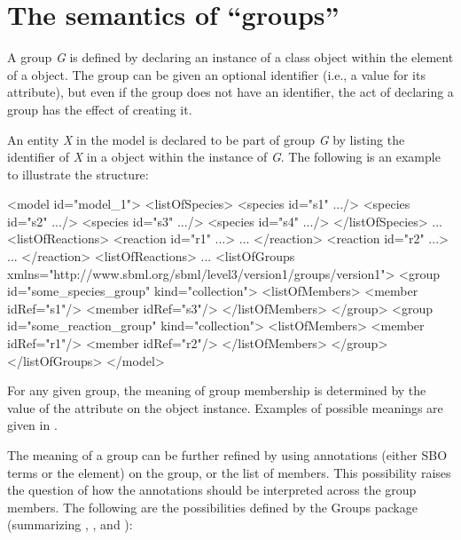 \section{The semantics of ``groups''}
\label{semantics}

A group \emph{G} is defined by declaring an instance of a \Group class object within the \ListOfGroups element of a \Model object. The group can be given an optional identifier (i.e., a value for its  attribute), but even if the group does not have an identifier, the act of declaring a group has the effect of creating it.

An entity \emph{X} in the model is declared to be part of group \emph{G} by listing the identifier of \emph{X} in a \Member object within the \ListOfGroups instance of \emph{G}. The following is an example to illustrate the structure:

\begin{example}
<model id="model_1"> 
  <listOfSpecies> 
    <species id="s1" .../> 
    <species id="s2" .../> 
    <species id="s3" .../> 
    <species id="s4" .../> 
  </listOfSpecies> 
  ... 
  <listOfReactions> 
    <reaction id="r1" ...> ... </reaction> 
    <reaction id="r2" ...> ... </reaction> 
  <listOfReactions> 
  ... 
  <listOfGroups xmlns="http://www.sbml.org/sbml/level3/version1/groups/version1"> 
    <group id="some_species_group" kind="collection"> 
      <listOfMembers> 
        <member idRef="s1"/> 
        <member idRef="s3"/> 
      </listOfMembers> 
    </group> 
    <group id="some_reaction_group" kind="collection"> 
      <listOfMembers> 
        <member idRef="r1"/> 
        <member idRef="r2"/> 
      </listOfMembers> 
    </group> 
  </listOfGroups> 
</model>
\end{example}

For any given group, the meaning of group membership is determined by the value of the attribute  on the \Group object instance.  Examples of possible meanings are given in .

The meaning of a group can be further refined by using annotations (either SBO terms or the \Annotation element) on the group, or the list of members. This possibility raises the question of how the annotations should be interpreted across the group members.  The following are the possibilities defined by the Groups package (summarizing , , and ):


